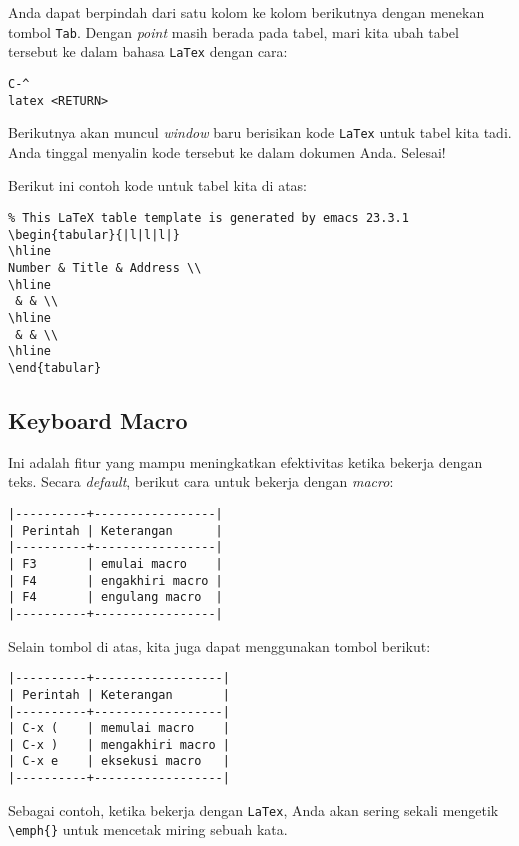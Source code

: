 \documentclass{article}
\begin{document}
Anda dapat berpindah dari satu kolom ke kolom berikutnya dengan menekan
tombol \verb=Tab=. Dengan \emph{point} masih berada pada tabel, mari kita ubah 
tabel tersebut ke dalam bahasa \verb=LaTex= dengan cara:

\begin{verbatim}
C-^
latex <RETURN>
\end{verbatim}

Berikutnya akan muncul \emph{window} baru berisikan kode \verb=LaTex= untuk 
tabel kita tadi. Anda tinggal menyalin kode tersebut ke dalam dokumen Anda.
Selesai!

Berikut ini contoh kode untuk tabel kita di atas:

\begin{verbatim}
% This LaTeX table template is generated by emacs 23.3.1
\begin{tabular}{|l|l|l|}
\hline
Number & Title & Address \\
\hline
 & & \\
\hline
 & & \\
\hline
\end{tabular}
\end{verbatim}

\subsection{Keyboard Macro}
Ini adalah fitur yang mampu meningkatkan efektivitas ketika bekerja dengan teks.
Secara \emph{default}, berikut cara untuk bekerja dengan \emph{macro}:

\begin{verbatim}
|----------+-----------------|
| Perintah | Keterangan      |
|----------+-----------------|
| F3       | emulai macro    |
| F4       | engakhiri macro |
| F4       | engulang macro  |
|----------+-----------------|
\end{verbatim}

Selain tombol di atas, kita juga dapat menggunakan tombol berikut:

\begin{verbatim}
|----------+------------------|
| Perintah | Keterangan       |
|----------+------------------|
| C-x (    | memulai macro    |
| C-x )    | mengakhiri macro |
| C-x e    | eksekusi macro   |
|----------+------------------|
\end{verbatim}

Sebagai contoh, ketika bekerja dengan \verb=LaTex=, Anda akan sering sekali
mengetik \verb=\emph{}= untuk mencetak miring sebuah kata.
\end{document}
